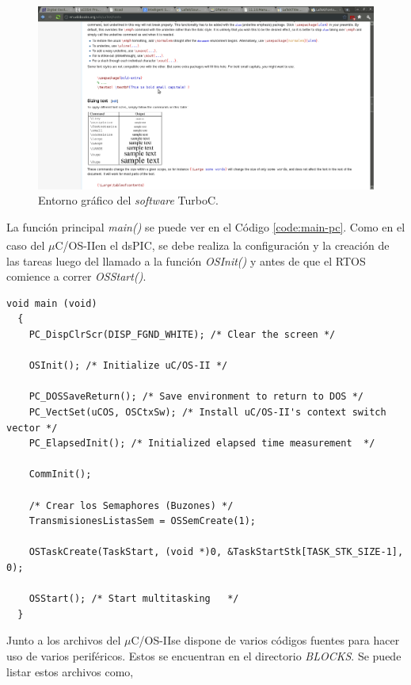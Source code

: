 \documentclass[11pt,a4paper,oneside]{article}
\def\uCOS{$\mu$C/OS-II\texttrademark}
\begin{document}
\begin{figure}[h]
  \centering
  \includegraphics[width=\textwidth]{images/ide-turboc}
  \caption{Entorno gráfico del \textsl{software} TurboC.}
  \label{fig:turboc}
\end{figure}

La función principal \emph{main()} se puede ver en el Código \ref{code:main-pc}. Como en el caso del \uCOS en el dsPIC\textsuperscript{\textregistered}, se debe realiza la configuración y la creación de las tareas luego del llamado a la función \emph{OSInit()} y antes de que el RTOS comience a correr \emph{OSStart()}.

\begin{lstlisting}[caption={Función principal del \uCOS sobre la PC (\emph{main()})},label=code:main-pc]
  void main (void)
  {
    PC_DispClrScr(DISP_FGND_WHITE); /* Clear the screen */

    OSInit(); /* Initialize uC/OS-II */

    PC_DOSSaveReturn(); /* Save environment to return to DOS */
    PC_VectSet(uCOS, OSCtxSw); /* Install uC/OS-II's context switch vector */
    PC_ElapsedInit(); /* Initialized elapsed time measurement  */
    
    CommInit();

    /* Crear los Semaphores (Buzones) */
    TransmisionesListasSem = OSSemCreate(1);
    
    OSTaskCreate(TaskStart, (void *)0, &TaskStartStk[TASK_STK_SIZE-1], 0);
    
    OSStart(); /* Start multitasking   */
  }
\end{lstlisting}

Junto a los archivos del \uCOS se dispone de varios códigos fuentes para hacer uso de varios periféricos. Estos se encuentran en el directorio \emph{BLOCKS}. Se puede  listar estos archivos como,
\end{document}
